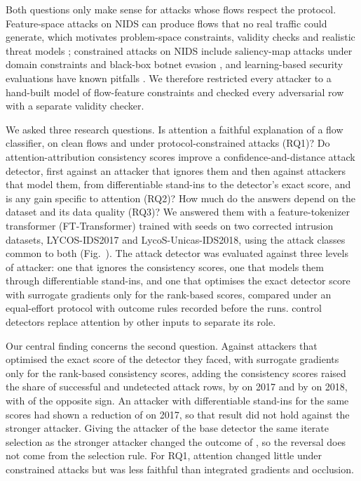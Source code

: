 Both questions only make sense for attacks whose flows respect the protocol.
Feature-space attacks on NIDS can produce flows that no real traffic could generate, which motivates problem-space
constraints, validity checks and realistic threat models \cite{pierazzi2020,alhussien2024,apruzzese2022}; constrained
attacks on NIDS include saliency-map attacks under domain constraints \cite{sheatsley2022} and black-box botnet evasion
\cite{debicha2023}, and learning-based security evaluations have known pitfalls \cite{arp2022}.
We therefore restricted every attacker to a hand-built model of flow-feature constraints and checked every adversarial
row with a separate validity checker.

We asked three research questions.
Is attention a faithful explanation of a flow classifier, on clean flows and under protocol-constrained attacks (RQ1)?
Do attention-attribution consistency scores improve a confidence-and-distance attack detector, first against an
attacker that ignores them and then against attackers that model them, from differentiable stand-ins to the
detector's exact score, and is any gain specific to attention (RQ2)?
How much do the answers depend on the dataset and its data quality (RQ3)?
We answered them with a feature-tokenizer transformer (FT-Transformer) trained with \nSeeds{} seeds on two corrected
intrusion datasets, LYCOS-IDS2017 and LycoS-Unicas-IDS2018, using the \nCommonClasses{} attack classes common to both
(Fig.~\mainFigPipeline).
The attack detector was evaluated against three levels of attacker: one that ignores the consistency scores, one that
models them through differentiable stand-ins, and one that optimises the exact detector score with surrogate gradients
only for the rank-based scores, compared under an equal-effort protocol with outcome rules recorded before the runs.
\nControlsAll{} control detectors replace attention by other inputs to separate its role.

Our central finding concerns the second question.
Against attackers that optimised the exact score of the detector they faced, with surrogate gradients only for the
\nRankScores{} rank-based consistency scores, adding the consistency scores raised the share of successful and
undetected attack rows, by \axHeadVoneSeventeenAbs{} on 2017 and by \axHeadVoneEighteenAbs{} on 2018, with
\axHeadOppSeedsPhrase{} of the opposite sign.
An attacker with differentiable stand-ins for the same scores had shown a reduction of \axStandinVoneSeventeenAbs{}
on 2017, so that result did not hold against the stronger attacker.
Giving the attacker of the base detector the same iterate selection as the stronger attacker changed the outcome of
\sxOutcomeChangedPhrase, so the reversal does not come from the selection rule.
For RQ1, attention changed little under constrained attacks but was less faithful than integrated gradients and
occlusion.

